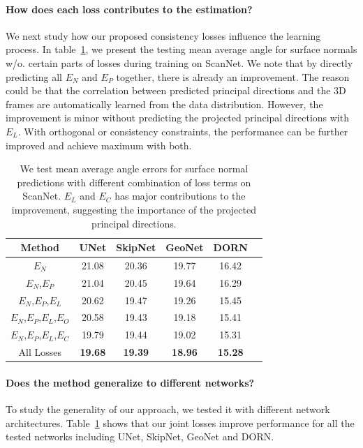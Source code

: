 \paragraph{How does each loss contributes to the estimation?}
We next study how our proposed consistency losses influence the learning process. In table~\ref{tab:framenet-consistency}, we present the testing mean average angle for surface normals w/o. certain parts of losses during training on ScanNet. We note that by directly predicting all $E_N$ and $E_P$ together, there is already an improvement. The reason could be that the correlation between predicted principal directions and the 3D frames are automatically learned from the data distribution. However, the improvement is minor without predicting the projected principal directions with $E_L$. With orthogonal or consistency constraints, the performance can be further improved and achieve maximum with both.
\begin{table}
    \centering
    \tabcolsep=0.20cm
    \small
    \begin{tabular}{|c|c|c|c|c|c|}
        \hline
         Method & UNet & SkipNet & GeoNet & DORN\\
         \hline
         $E_N$ & 21.08 & 20.36 & 19.77 & 16.42\\
         \hline
         $E_N$,$E_P$ & 21.04 & 20.45 & 19.64 & 16.29\\
         \hline
         $E_N$,$E_P$,$E_L$ & 20.62 & 19.47 & 19.26 & 15.45\\
         \hline
         $E_N$,$E_P$,$E_L$,$E_O$ & 20.58 & 19.43 & 19.18 & 15.41\\
         \hline
         $E_N$,$E_P$,$E_L$,$E_C$ & 19.79 & 19.44 & 19.02 & 15.31\\
         \hline
         All Losses & \textbf{19.68} & \textbf{19.39} & \textbf{18.96} & \textbf{15.28}\\
         \hline
    \end{tabular}
    \caption{We test mean average angle errors for surface normal predictions with different combination of loss terms on ScanNet. $E_L$ and $E_C$ has major contributions to the improvement, suggesting the importance of the projected principal directions.}
    \label{tab:framenet-consistency}
\end{table}

\vspace{-0.1in}
\paragraph{Does the method generalize to different networks?}  To study the generality of our approach, we tested it with different network architectures.   Table~\ref{tab:framenet-consistency} shows that our joint losses improve performance for all the tested networks including UNet\cite{ronneberger2015u}, SkipNet\cite{bansal2016marr}, GeoNet\cite{qi2018geonet} and DORN\cite{fu2018deep}.

